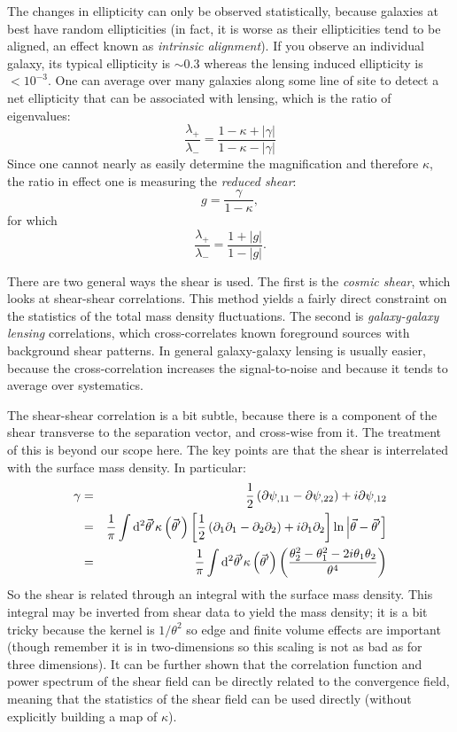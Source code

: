 The changes in ellipticity can only be observed statistically, because
galaxies at best have random ellipticities (in fact, it is worse as
their ellipticities tend to be aligned, an effect known as {\it
intrinsic alignment}). If you observe an individual galaxy, its
typical ellipticity is $\sim 0.3$ whereas the lensing induced
ellipticity is $<10^{-3}$. One can average over many galaxies along
some line of site to detect a net ellipticity that can be associated
with lensing, which is the ratio of eigenvalues:
\begin{equation}
\frac{\lambda_+}{\lambda_-} = \frac{1-\kappa +  |\gamma|}{1-\kappa -
|\gamma|}
\end{equation}
Since one cannot nearly as easily determine the magnification and
therefore $\kappa$, the ratio in effect one is measuring the {\it
reduced shear}:
\begin{equation}
g = \frac{\gamma}{1-\kappa},
\end{equation}
for which
\begin{equation}
\frac{\lambda_+}{\lambda_-} = \frac{1 +  |g|}{1- |g|}.
\end{equation}

There are two general ways the shear is used. The first is the {\it
cosmic shear}, which looks at shear-shear correlations. This method
yields a fairly direct constraint on the statistics of the total mass
density fluctuations. The second is {\it galaxy-galaxy lensing}
correlations, which cross-correlates known foreground sources with
background shear patterns. In general galaxy-galaxy lensing is usually
easier, because the cross-correlation increases the signal-to-noise
and because it tends to average over systematics. 

The shear-shear correlation is a bit subtle, because there is a
component of the shear transverse to the separation vector, and
cross-wise from it. The treatment of this is beyond our scope
here. The key points are that the shear is interrelated with the
surface mass density. In particular:
\begin{eqnarray}
\gamma &=& \frac{1}{2}\left(\partial\psi_{,11}
- \partial\psi_{,22}\right) + i \partial\psi_{,12} \cr
&=& \frac{1}{\pi} \int {\rm d}^2\vec{\theta}' \kappa\left(\vec{\theta}'\right)
\left[\frac{1}{2}\left(\partial_1\partial_1 - \partial_2 \partial_2\right)
+ i \partial_1 \partial_2\right]
\ln \left|\vec{\theta} - \vec{\theta}'\right] \cr
&=& \frac{1}{\pi} \int {\rm d}^2\vec{\theta}' \kappa\left(\vec{\theta}'\right)
\left( \frac{\theta_2^2 - \theta_1^2 -
2i \theta_1\theta_2}{\theta^4} \right)
\end{eqnarray}
So the shear is related through an integral with the surface mass
density. This integral may be inverted from shear data to yield the
mass density; it is a bit tricky because the kernel is $1/\theta^2$ so
edge and finite volume effects are important (though remember it is in
two-dimensions so this scaling is not as bad as for three dimensions).
It can be further shown that the correlation function and power
spectrum of the shear field can be directly related to the convergence
field, meaning that the statistics of the shear field can be used
directly (without explicitly building a map of $\kappa$).

